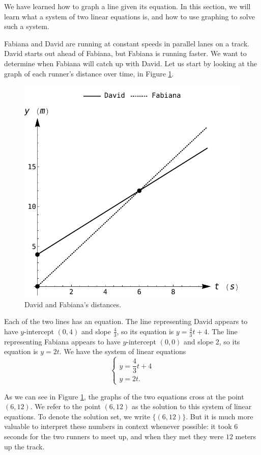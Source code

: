 We have learned how to graph a line given its equation. In this section, we will learn what a system of two linear equations is, and how to use graphing to solve such a system.

\begin{example}\label{graphing_syst_lin_eq_ex1}
Fabiana and David are running at constant speeds in parallel lanes on a track. David starts
out ahead of Fabiana, but Fabiana is running faster. We want to determine when Fabiana will
catch up with David. Let us start by looking at the graph of each runner's distance over time, in Figure \ref{fig_Systems_lin_eq_1}.\\

\begin{figure}[H]
	\centering
	\includegraphics[scale=0.5]{fig_Systems_lin_eq_1}
	\caption{David and Fabiana's distances.}
	\label{fig_Systems_lin_eq_1}
\end{figure}


Each of the two lines has an equation. The line representing David appears to have $y$-intercept $(0,4)$ and slope $\frac{4}{3}$, so its equation is $y = \frac{4}{3}t+4$. The line representing Fabiana appears to have $y$-intercept $(0,0)$ and
slope $2$, so its equation is $y=2t$.	
We have the system of linear equations
\[\left\{ \begin{array}{l} y = \dfrac{4}{3}t+4 \\[0.2cm] y=2t.  \end{array} \right.  \]	

As we can see in Figure \ref{fig_Systems_lin_eq_1}, the graphs of the two equations cross at the point $(6,12)$. We refer to the point $(6,12)$ as the solution to this system of linear equations. To denote the solution set, we write	$\{(6,12)\}$. But it is much more valuable to interpret these numbers in context whenever possible: it took $6$ seconds for the two runners to meet up, and when they met they were $12$ meters up the track.
	
\end{example}

